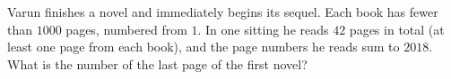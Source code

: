 Varun finishes a novel and immediately begins its sequel. Each book has fewer than $1000$ pages, numbered from $1$. In one sitting he reads $42$ pages in total (at least one page from each book), and the page numbers he reads sum to $2018$. What is the number of the last page of the first novel?
